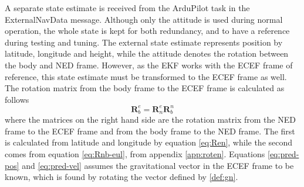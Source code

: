     A separate state estimate is received from the ArduPilot task in the ExternalNavData message. Although only the attitude is used during normal operation, the whole state is kept for both redundancy, and to have a reference during testing and tuning. The external state estimate represents position by latitude, longitude and height, while the attitude denotes the rotation between the body and NED frame. However, as the EKF works with the ECEF frame of reference, this state estimate must be transformed to the ECEF frame as well. The rotation matrix from the body frame to the ECEF frame is calculated as follows
    \begin{equation}
        \mathbf{R}^e_b = \mathbf{R}^e_n\mathbf{R}^n_b
    \end{equation}
    where the matrices on the right hand side are the rotation matrix from the NED frame to the ECEF frame and from the body frame to the NED frame. The first is calculated from latitude and longitude by equation \ref{eq:Ren}, while the second comes from equation \ref{eq:Rnb-eul}, from appendix \ref{app:roten}. Equations \ref{eq:pred-pos} and \ref{eq:pred-vel} assumes the gravitational vector in the ECEF frame to be known, which is found by rotating the vector defined by \ref{def:gn}. 
    
    
    
